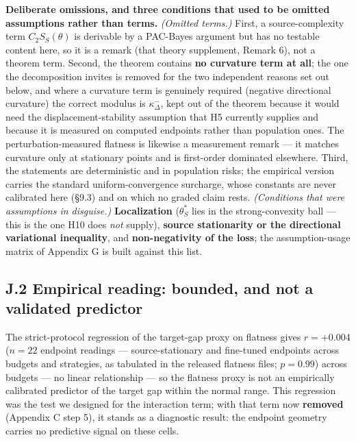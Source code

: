 \documentclass[pdflatex,sn-mathphys-ay]{sn-jnl}
\begin{document}
\textbf{Deliberate omissions, and three conditions that used to be omitted assumptions rather than terms.} \emph{(Omitted terms.)} First, a source-complexity term $C_2S_S(\theta)$ is derivable by a PAC-Bayes argument but has no testable content here, so it is a remark (that theory supplement, Remark 6), not a theorem term. Second, the theorem contains \textbf{no curvature term at all}; the one the decomposition invites is removed for the two independent reasons set out below, and where a curvature term is genuinely required (negative directional curvature) the correct modulus is $\kappa^-_\Delta$, kept out of the theorem because it would need the displacement-stability assumption that H5 currently supplies and because it is measured on computed endpoints rather than population ones. The perturbation-measured flatness is likewise a measurement remark --- it matches curvature only at stationary points and is first-order dominated elsewhere. Third, the statements are deterministic and in population risks; the empirical version carries the standard uniform-convergence surcharge, whose constants are never calibrated here (\S{}9.3) and on which no graded claim rests. \emph{(Conditions that were assumptions in disguise.)} \textbf{Localization} ($\theta^*_S$ lies in the strong-convexity ball --- this is the one H10 does \emph{not} supply), \textbf{source stationarity or the directional variational inequality}, and \textbf{non-negativity of the loss}; the assumption-usage matrix of Appendix G is built against this list.

\subsection*{J.2 Empirical reading: bounded, and not a validated predictor}

The strict-protocol regression of the target-gap proxy on flatness gives $r = +0.004$ ($n = 22$ endpoint readings --- source-stationary and fine-tuned endpoints across budgets and strategies, as tabulated in the released flatness files; $p = 0.99$) across budgets --- no linear relationship --- so the flatness proxy is not an empirically calibrated predictor of the target gap within the normal range. This regression was the test we designed for the interaction term; with that term now \textbf{removed} (Appendix C step 5), it stands as a diagnostic result: the endpoint geometry carries no predictive signal on these cells.
\end{document}
